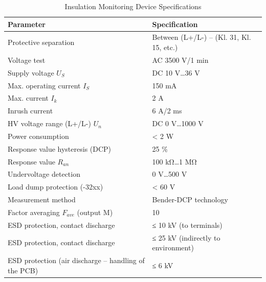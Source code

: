 \begin{table}[H]
    \centering
    \caption{Insulation Monitoring Device Specifications}
    \label{tab:table1}
    \begin{adjustbox}{width=\textwidth}
    \begin{tabular}{|l|l|}
        \hline
        \textbf{Parameter} & \textbf{Specification} \\
        \hline
        Protective separation & Between (L+/L-) – (Kl. 31, Kl. 15, etc.) \\
        Voltage test & AC 3500 V/1 min \\
        Supply voltage \(U_S\) & DC 10 V…36 V \\
        Max. operating current \(I_S\) & 150 mA \\
        Max. current \(I_k\) & 2 A \\
        Inrush current & 6 A/2 ms \\
        HV voltage range (L+/L-) \(U_n\)
        & DC 0 V…1000 V \\
        Power consumption & < 2 W \\
        Response value hysteresis (DCP) & 25 \% \\
        Response value \(R_{an}\) & 100 kΩ…1 MΩ \\
        Undervoltage detection & 0 V…500 V \\
        Load dump protection (-32xx) & < 60 V \\
        Measurement method & Bender-DCP technology \\
        Factor averaging \(F_{ave}\) (output M) & 10 \\
        ESD protection, contact discharge   & ≤ 10 kV (to terminals)\\
        ESD protection, contact discharge  & ≤ 25 kV (indirectly to environment) \\
        ESD protection (air discharge – handling of the PCB) & ≤ 6 kV \\
        \hline
    \end{tabular}
    \end{adjustbox}
\end{table}

